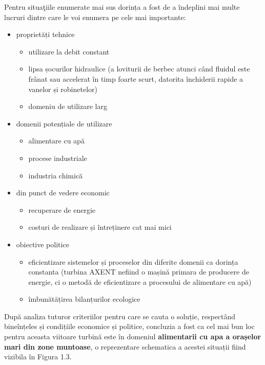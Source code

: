 Pentru situa\c{t}iile enumerate mai sus dorința a fost de a îndeplini mai multe lucruri dintre care le voi enumera pe cele mai importante:

\begin{itemize}
	\item proprietăți tehnice
		\begin{itemize}
			\item utilizare la debit constant
			\item lipsa șocurilor hidraulice (a loviturii de berbec atunci când fluidul este frânat sau accelerat în timp foarte scurt, datorita închiderii rapide a vanelor și robinetelor)
			\item domeniu de utilizare larg
		\end{itemize}
	\item domenii potențiale de utilizare
		\begin{itemize}
			\item alimentare cu apă
			\item procese industriale
			\item industria chimică
		\end{itemize}
	\item din punct de vedere economic
		\begin{itemize}
			\item recuperare de energie
			\item costuri de realizare și întreținere cat mai mici
		\end{itemize}
	\item obiective politice
		\begin{itemize}
			\item eficientizare sistemelor și proceselor din diferite domenii ca dorința constanta (turbina AXENT nefiind o mașină primara de producere de energie, ci o metodă de eficientizare a procesului de alimentare cu apă)
			\item îmbunătățirea bilanțurilor ecologice
		\end{itemize}	
\end{itemize}

După analiza tuturor criteriilor pentru care se cauta o soluție, respectând bineînțeles și condițiile economice și politice, concluzia a fost ca cel mai bun loc pentru aceasta viitoare turbină este în domeniul \textbf{alimentarii cu apa a orașelor mari din zone muntoase}, o reprezentare schematica a acestei situații fiind vizibila în Figura 1.3.

